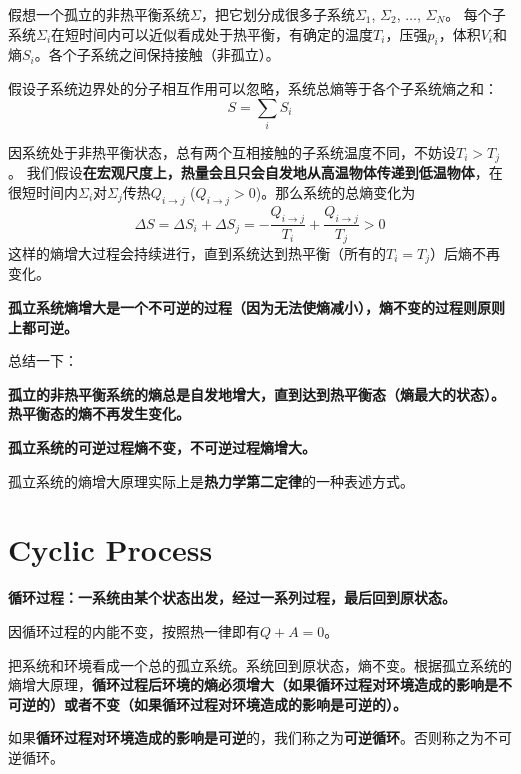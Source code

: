 \documentclass[CJK]{beamer}
\begin{document}
\begin{frame}
\bch
假想一个孤立的非热平衡系统$\Sigma$，把它划分成很多子系统$\Sigma_1$, $\Sigma_2$, $\ldots$, $\Sigma_N$。
每个子系统$\Sigma_i$在短时间内可以近似看成处于热平衡，有确定的温度$T_i$，压强$p_i$，体积$V_i$和熵$S_i$。各个子系统之间保持接触（非孤立）。

\skiplines


假设子系统边界处的分子相互作用可以忽略，系统总熵等于各个子系统熵之和：
$$S = \sum_i S_i$$
\ech
\end{frame}

\begin{frame}
\bch
因系统处于非热平衡状态，总有两个互相接触的子系统温度不同，不妨设$T_i>T_j$。
我们假设{\bf 在宏观尺度上，热量会且只会自发地从高温物体传递到低温物体}，在很短时间内$\Sigma_i$对$\Sigma_j$传热$Q_{i\rightarrow j}$ ($Q_{i\rightarrow j}>0$)。那么系统的总熵变化为
$$\Delta S = \Delta S_i + \Delta S_j = - \frac{Q_{i\rightarrow j}}{T_i}+ \frac{Q_{i\rightarrow j}}{T_j}  > 0$$
这样的熵增大过程会持续进行，直到系统达到热平衡（所有的$T_i = T_j$）后熵不再变化。

{\bf 孤立系统熵增大是一个不可逆的过程（因为无法使熵减小），熵不变的过程则原则上都可逆。}

\ech
\end{frame}

\begin{frame}
\bch
总结一下：

\bitem
\item{\bf 孤立的非热平衡系统的熵总是自发地增大，直到达到热平衡态（熵最大的状态）。热平衡态的熵不再发生变化。}
\item{\bf 孤立系统的可逆过程熵不变，不可逆过程熵增大。}
\eitem

孤立系统的熵增大原理实际上是{\bf 热力学第二定律}的一种表述方式。

\ech
\end{frame}


\section{Cyclic Process}

\begin{frame}
\bch
{}
\ech
\end{frame}

\begin{frame}
\bch
{\bf 循环过程：一系统由某个状态出发，经过一系列过程，最后回到原状态。}

\skiplines
\bitem
\item{因循环过程的内能不变，按照热一律即有$Q+A = 0$。}
\item{把系统和环境看成一个总的孤立系统。系统回到原状态，熵不变。根据孤立系统的熵增大原理，{\bf 循环过程后环境的熵必须增大（如果循环过程对环境造成的影响是不可逆的）或者不变（如果循环过程对环境造成的影响是可逆的）。}}
\eitem

如果{\bf 循环过程对环境造成的影响是可逆}的，我们称之为{\bf 可逆循环}。否则称之为不可逆循环。

\ech
\end{frame}
\end{document}
